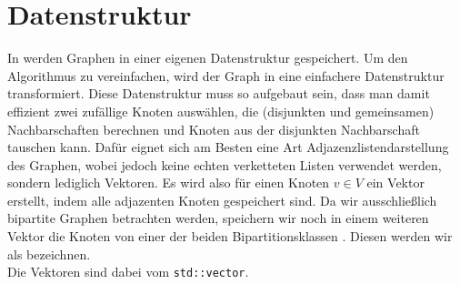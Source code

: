 \section{Datenstruktur}
In \nk {} werden Graphen in einer eigenen Datenstruktur gespeichert. Um den Algorithmus 
zu vereinfachen, wird der Graph in eine einfachere Datenstruktur transformiert.
Diese Datenstruktur muss so aufgebaut sein, dass man damit effizient zwei zufällige
Knoten auswählen, die (disjunkten und gemeinsamen) Nachbarschaften berechnen und Knoten aus der
disjunkten Nachbarschaft tauschen kann. Dafür eignet sich am Besten  
eine Art Adjazenzlistendarstellung des Graphen, wobei jedoch keine echten verketteten
Listen verwendet werden, sondern lediglich Vektoren. 
Es wird also für einen Knoten
$v \in V$ ein Vektor erstellt, indem alle adjazenten Knoten gespeichert sind.
Da wir ausschließlich bipartite Graphen betrachten werden, speichern wir noch in 
einem weiteren Vektor die Knoten von einer der beiden Bipartitionsklassen . Diesen
werden wir als \red{\fett{\partvek}} bezeichnen.
\\
Die Vektoren sind dabei vom \cpp {} \texttt{std::vector}.


